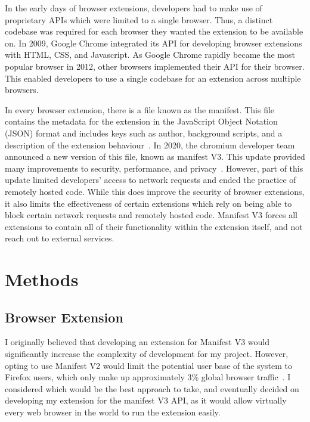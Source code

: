 \documentclass[twocolumn]{report}
\begin{document}
In the early days of browser extensions, developers had to make use of proprietary APIs which were limited to a single browser. Thus, a distinct codebase was required for each browser they wanted the extension to be available on. In 2009, Google Chrome integrated its API for developing browser extensions with HTML, CSS, and Javascript. As Google Chrome rapidly became the most popular browser in 2012, other browsers implemented their API for their browser. This enabled developers to use a single codebase for an extension across multiple browsers. 

In every browser extension, there is a file known as the manifest. This file contains the metadata for the extension in the JavaScript Object Notation (JSON) format and includes keys such as author, background scripts, and a description of the extension behaviour~\cite{bengtsson2020manifest}. In 2020, the chromium developer team announced a new version of this file, known as manifest V3. This update provided many improvements to security, performance, and privacy~\cite{li2020manifest}. However, part of this update limited developers' access to network requests and ended the practice of remotely hosted code. While this does improve the security of browser extensions, it also limits the effectiveness of certain extensions which rely on being able to block certain network requests and remotely hosted code. Manifest V3 forces all extensions to contain all of their functionality within the extension itself, and not reach out to external services. 



\chapter{Methods}


\section{Browser Extension}

I originally believed that developing an extension for Manifest V3 would significantly increase the complexity of development for my project. However, opting to use Manifest V2 would limit the potential user base of the system to Firefox users, which only make up approximately 3\% global browser traffic~\cite{statcounter2024browser}. I considered which would be the best approach to take, and eventually decided on developing my extension for the manifest V3 API, as it would allow virtually every web browser in the world to run the extension easily.
\end{document}
